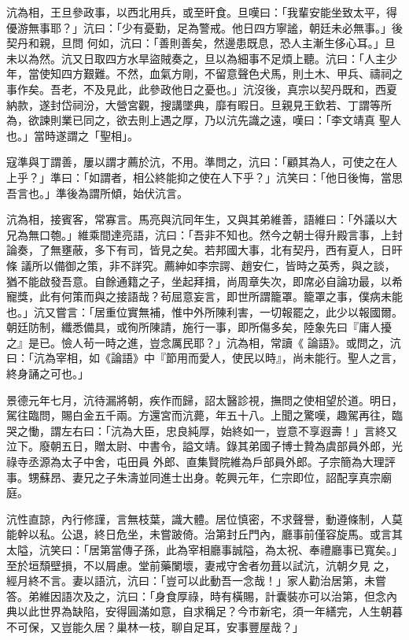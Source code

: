\begin{pinyinscope}
 沆為相，王旦參政事，以西北用兵，或至旰食。旦嘆曰：「我輩安能坐致太平，得優游無事耶？」沆曰：「少有憂勤，足為警戒。他日四方寧謐，朝廷未必無事。」後契丹和親，旦問
 何如，沆曰：「善則善矣，然邊患既息，恐人主漸生侈心耳。」旦未以為然。沆又日取四方水旱盜賊奏之，旦以為細事不足煩上聽。沆曰：「人主少年，當使知四方艱難。不然，血氣方剛，不留意聲色犬馬，則土木、甲兵、禱祠之事作矣。吾老，不及見此，此參政他日之憂也。」沆沒後，真宗以契丹既和，西夏納款，遂封岱祠汾，大營宮觀，搜講墜典，靡有暇日。旦親見王欽若、丁謂等所為，欲諫則業已同之，欲去則上遇之厚，乃以沆先識之遠，嘆曰：「李文靖真
 聖人也。」當時遂謂之「聖相」。



 寇準與丁謂善，屢以謂才薦於沆，不用。準問之，沆曰：「顧其為人，可使之在人上乎？」準曰：「如謂者，相公終能抑之使在人下乎？」沆笑曰：「他日後悔，當思吾言也。」準後為謂所傾，始伏沆言。



 沆為相，接賓客，常寡言。馬亮與沆同年生，又與其弟維善，語維曰：「外議以大兄為無口匏。」維乘間達亮語，沆曰：「吾非不知也。然今之朝士得升殿言事，上封論奏，了無壅蔽，多下有司，皆見之矣。若邦國大事，北有契丹，西有夏人，日旰條
 議所以備御之策，非不詳究。薦紳如李宗諤、趙安仁，皆時之英秀，與之談，猶不能啟發吾意。自餘通籍之子，坐起拜揖，尚周章失次，即席必自論功最，以希寵獎，此有何策而與之接語哉？茍屈意妄言，即世所謂籠罩。籠罩之事，僕病未能也。」沆又嘗言：「居重位實無補，惟中外所陳利害，一切報罷之，此少以報國爾。朝廷防制，纖悉備具，或徇所陳請，施行一事，即所傷多矣，陸象先曰『庸人擾之』是已。憸人茍一時之進，豈念厲民耶？」沆為相，常讀《
 論語》。或問之，沆曰：「沆為宰相，如《論語》中『節用而愛人，使民以時』，尚未能行。聖人之言，終身誦之可也。」



 景德元年七月，沆待漏將朝，疾作而歸，詔太醫診視，撫問之使相望於道。明日，駕往臨問，賜白金五千兩。方還宮而沆薨，年五十八。上聞之驚嘆，趣駕再往，臨哭之慟，謂左右曰：「沆為大臣，忠良純厚，始終如一，豈意不享遐壽！」言終又泣下。廢朝五日，贈太尉、中書令，謚文靖。錄其弟國子博士贄為虞部員外郎，光祿寺丞源為太子中舍，屯田員
 外郎、直集賢院維為戶部員外郎。子宗簡為大理評事。甥蘇昂、妻兄之子朱濤並同進士出身。乾興元年，仁宗即位，詔配享真宗廟庭。



 沆性直諒，內行修謹，言無枝葉，識大體。居位慎密，不求聲譽，動遵條制，人莫能幹以私。公退，終日危坐，未嘗跛倚。治第封丘門內，廳事前僅容旋馬。或言其太隘，沆笑曰：「居第當傳子孫，此為宰相廳事誠隘，為太祝、奉禮廳事已寬矣。」至於垣頹壁損，不以屑慮。堂前藥闌壞，妻戒守舍者勿葺以試沆，沆朝夕見
 之，經月終不言。妻以語沆，沆曰：「豈可以此動吾一念哉！」家人勸治居第，未嘗答。弟維因語次及之，沆曰：「身食厚祿，時有橫賜，計囊裝亦可以治第，但念內典以此世界為缺陷，安得圓滿如意，自求稱足？今市新宅，須一年繕完，人生朝暮不可保，又豈能久居？巢林一枝，聊自足耳，安事豐屋哉？」




\end{pinyinscope}
